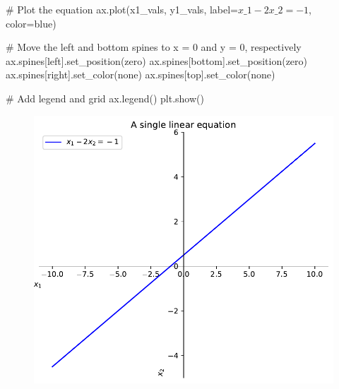 \documentclass[
  letterpaper,
  DIV=11,
  numbers=noendperiod]{scrreprt}
\newenvironment{Shaded}{\begin{snugshade}}{\end{snugshade}}
\newcommand{\CommentTok}[1]{\textcolor[rgb]{0.37,0.37,0.37}{#1}}
\newcommand{\NormalTok}[1]{\textcolor[rgb]{0.00,0.23,0.31}{#1}}
\newcommand{\OperatorTok}[1]{\textcolor[rgb]{0.37,0.37,0.37}{#1}}
\newcommand{\StringTok}[1]{\textcolor[rgb]{0.13,0.47,0.30}{#1}}
\begin{document}
\begin{Shaded}
\begin{Highlighting}[]
\CommentTok{\# Plot the equation}
\NormalTok{ax.plot(x1\_vals, y1\_vals, label}\OperatorTok{=}\StringTok{\textquotesingle{}$x\_1 {-} 2x\_2 = {-}1$\textquotesingle{}}\NormalTok{, color}\OperatorTok{=}\StringTok{\textquotesingle{}blue\textquotesingle{}}\NormalTok{)}

\CommentTok{\# Move the left and bottom spines to x = 0 and y = 0, respectively}
\NormalTok{ax.spines[}\StringTok{\textquotesingle{}left\textquotesingle{}}\NormalTok{].set\_position(}\StringTok{\textquotesingle{}zero\textquotesingle{}}\NormalTok{)}
\NormalTok{ax.spines[}\StringTok{\textquotesingle{}bottom\textquotesingle{}}\NormalTok{].set\_position(}\StringTok{\textquotesingle{}zero\textquotesingle{}}\NormalTok{)}
\NormalTok{ax.spines[}\StringTok{\textquotesingle{}right\textquotesingle{}}\NormalTok{].set\_color(}\StringTok{\textquotesingle{}none\textquotesingle{}}\NormalTok{)}
\NormalTok{ax.spines[}\StringTok{\textquotesingle{}top\textquotesingle{}}\NormalTok{].set\_color(}\StringTok{\textquotesingle{}none\textquotesingle{}}\NormalTok{)}

\CommentTok{\# Add legend and grid}
\NormalTok{ax.legend()}
\NormalTok{plt.show()}
\end{Highlighting}
\end{Shaded}

\begin{figure}[H]

{\centering \includegraphics{p1_files/figure-pdf/cell-2-output-1.pdf}

}

\end{figure}
\end{document}
